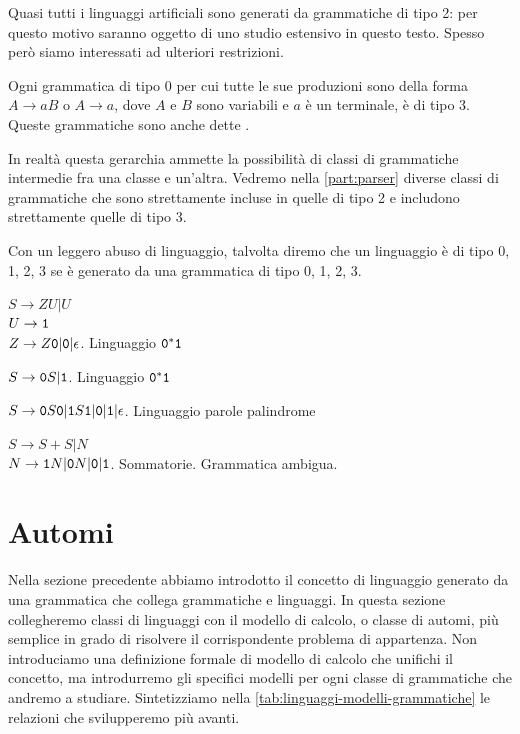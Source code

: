 Quasi tutti i linguaggi artificiali sono generati da grammatiche di tipo 2: per questo motivo saranno oggetto di uno
studio estensivo in questo testo.
Spesso però siamo interessati ad ulteriori restrizioni.

\begin{definition}\label{def:tipo-3}
	Ogni grammatica \gramm di tipo 0 per cui tutte le sue produzioni sono della forma $A\to aB$ o $A\to a$, dove $A$ e $B$ sono
	variabili e $a$ è un terminale, è di tipo 3.
	Queste grammatiche sono anche dette .
\end{definition}

In realtà questa gerarchia ammette la possibilità di classi di grammatiche intermedie fra una classe e un'altra.
Vedremo nella \cref{part:parser} diverse classi di grammatiche che sono strettamente incluse in quelle di tipo 2 e
includono strettamente quelle di tipo 3.

Con un leggero abuso di linguaggio, talvolta diremo che un linguaggio è di tipo 0, 1, 2, 3 se è generato da una
grammatica di tipo 0, 1, 2, 3.

\begin{example}\label{exa:grammatica1}
$S \to ZU | U$\\
$U \to \mathtt{1}$\\
$Z\to Z\mathtt{0} | \mathtt{0} | \epsilon$.
Linguaggio $\mathtt{0}^{*}\mathtt{1}$
\end{example}


\begin{example}\label{exa:grammatica2}
$S \to  \mathtt{0} S | \mathtt{1}$.
Linguaggio $\mathtt{0}^{*}\mathtt{1}$
\end{example}


\begin{example}\label{exa:grammatica1}
$S \to \mathtt{0} S\mathtt{0} | \mathtt{1} S\mathtt{1} | \mathtt{0} | \mathtt{1}| \epsilon$.
Linguaggio parole palindrome
\end{example}


\begin{example}\label{exa:grammatica1}
$S \to S + S | N$\\
$N \to \mathtt{1} N | \mathtt{0} N |\mathtt{0} | \mathtt{1}$.
Sommatorie.
Grammatica ambigua.

\end{example}


\section{Automi}\label{sec:automi}

Nella sezione precedente abbiamo introdotto il concetto di linguaggio generato da una grammatica che collega grammatiche
e linguaggi.
In questa sezione collegheremo classi di linguaggi con il modello di calcolo, o classe di automi, più semplice in grado di
risolvere il corrispondente problema di appartenza.
Non introduciamo una definizione formale di modello di calcolo che unifichi il concetto, ma introdurremo gli specifici
modelli per ogni classe di grammatiche che andremo a studiare.
Sintetizziamo nella \cref{tab:linguaggi-modelli-grammatiche} le relazioni che svilupperemo più avanti.


